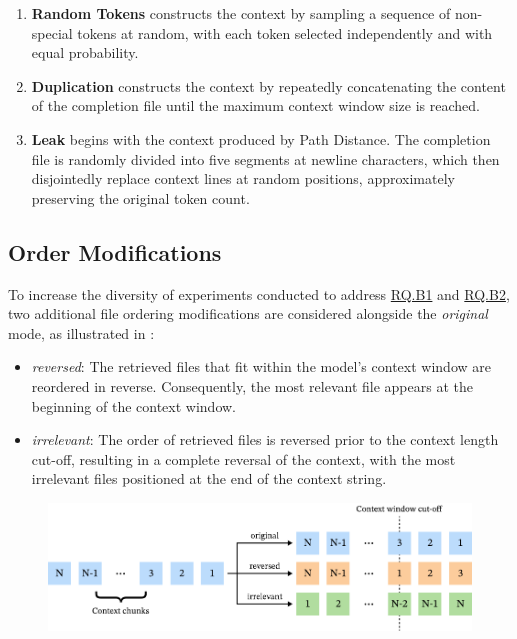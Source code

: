 \begin{enumerate}
    \item \textbf{Random Tokens} constructs the context by sampling a sequence of non-special tokens at random, with each token selected independently and with equal probability.
    \item \textbf{Duplication} constructs the context by repeatedly concatenating the content of the completion file until the maximum context window size is reached.
    \item \textbf{Leak} begins with the context produced by Path Distance. The completion file is randomly divided into five segments at newline characters, which then disjointedly replace context lines at random positions, approximately preserving the original token count. \parencite{sapronov2025}
\end{enumerate}

\subsection{Order Modifications}

To increase the diversity of experiments conducted to address \hyperref[rq:rq-b1]{RQ.B1} and \hyperref[rq:rq-b2]{RQ.B2}, two additional file ordering modifications are considered alongside the \textit{original} mode, as illustrated in :

\begin{itemize}
    \item \textit{reversed}: The retrieved files that fit within the model's context window are reordered in reverse. Consequently, the most relevant file appears at the beginning of the context window.
    \item \textit{irrelevant}: The order of retrieved files is reversed prior to the context length cut-off, resulting in a complete reversal of the context, with the most irrelevant files positioned at the end of the context string.
\end{itemize}

\begin{figure}[ht]
    \centering
    \includegraphics[width=\textwidth]{figures/order-modes.pdf}
    \label{fig:order-modes}
\end{figure}

